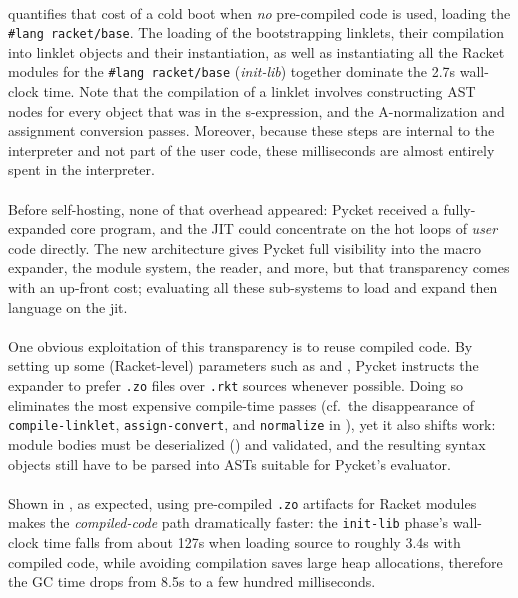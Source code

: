 		\paragraph{}%
			 quantifies that cost of a cold boot when \emph{no} pre-compiled code is used, loading the \texttt{\#lang racket/base}. The loading of the bootstrapping linklets, their compilation into linklet objects and their instantiation, as well as instantiating all the Racket modules for the \texttt{\#lang racket/base} (\emph{init-lib}) together dominate the 2.7s wall-clock time. Note that the compilation of a linklet involves constructing AST nodes for every object that was in the s-expression, and the A-normalization and assignment conversion passes. Moreover, because these steps are internal to the interpreter and not part of the user code, these milliseconds are almost entirely spent in the interpreter.

		\paragraph{}%
			Before self-hosting, none of that overhead appeared: Pycket received a fully-expanded core program, and the JIT could concentrate on the hot loops of \emph{user} code directly. The new architecture gives Pycket full visibility into the macro expander, the module system, the reader, and more, but that transparency comes with an up-front cost; evaluating all these sub-systems to load and expand then language on the \gls{jit}.

		\paragraph{}%
			One obvious exploitation of this transparency is to reuse compiled code. By setting up some (Racket-level) parameters such as  and , Pycket instructs the expander to prefer \texttt{.zo} files over \texttt{.rkt} sources whenever possible. Doing so eliminates the most expensive compile-time passes (cf.\ the disappearance of \texttt{compile-linklet}, \texttt{assign-convert}, and \texttt{normalize} in ), yet it also shifts work: module bodies must be deserialized () and validated, and the resulting syntax objects still have to be parsed into ASTs suitable for Pycket's evaluator.

		\paragraph{}%
			Shown in , as expected, using pre-compiled \texttt{.zo} artifacts for Racket modules makes the \emph{compiled-code} path dramatically faster: the \texttt{init-lib} phase's wall-clock time falls from about 127s when loading source to roughly 3.4s with compiled code, while avoiding compilation saves large heap allocations, therefore the GC time drops from 8.5s to a few hundred milliseconds.

